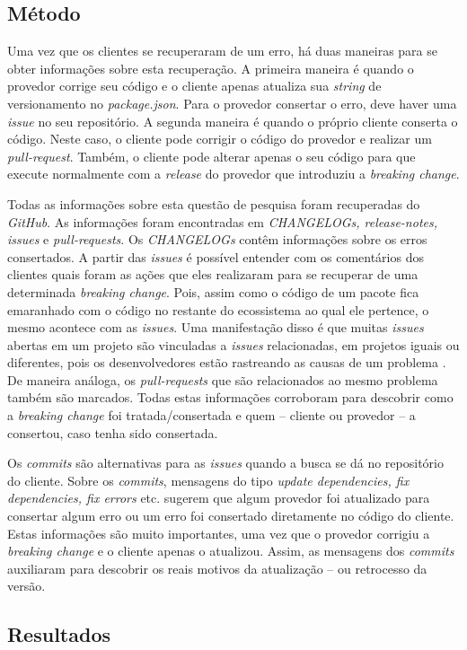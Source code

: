 \subsection{Método}
\label{apr:rq3}
Uma vez que os clientes se recuperaram de um erro, há duas maneiras para se obter informações sobre esta recuperação. A primeira maneira é quando o provedor corrige seu código e o cliente apenas atualiza sua \textit{string} de versionamento no \textit{package.json}. Para o provedor consertar o erro, deve haver uma \textit{issue} no seu repositório. A segunda maneira é quando o próprio cliente conserta o código. Neste caso, o cliente pode corrigir o código do provedor e realizar um \textit{pull-request}. Também, o cliente pode alterar apenas o seu código para que execute normalmente com a \textit{release} do provedor que introduziu a \textit{breaking change}.

Todas as informações sobre esta questão de pesquisa foram recuperadas do \textit{GitHub}. As informações foram encontradas em \textit{CHANGELOGs, release-notes, issues} e \textit{pull-requests}. Os \textit{CHANGELOGs} contêm informações sobre os erros consertados. A partir das \textit{issues} é possível entender com os comentários dos clientes quais foram as ações que eles realizaram para se recuperar de uma determinada \textit{breaking change}. Pois, assim como o código de um pacote fica emaranhado com o código no restante do ecossistema ao qual ele pertence, o mesmo acontece com as \textit{issues}. Uma manifestação disso é que muitas \textit{issues} abertas em um projeto são vinculadas a \textit{issues} relacionadas, em projetos iguais ou diferentes, pois os desenvolvedores estão rastreando as causas de um problema \cite{Zhang:2018:WIL:3242887.3242891}. De maneira análoga, os \textit{pull-requests} que são relacionados ao mesmo problema também são marcados. Todas estas informações corroboram para descobrir como a \textit{breaking change} foi tratada/consertada e quem -- cliente ou provedor -- a consertou, caso tenha sido consertada.

Os \textit{commits} são alternativas para as \textit{issues} quando a busca se dá no repositório do cliente. Sobre os \textit{commits}, mensagens do tipo \textit{update dependencies, fix dependencies, fix errors} etc. sugerem que algum provedor foi atualizado para consertar algum erro ou um erro foi consertado diretamente no código do cliente. Estas informações são muito importantes, uma vez que o provedor corrigiu a \textit{breaking change} e o cliente apenas o atualizou. Assim, as mensagens dos \textit{commits} auxiliaram para descobrir os reais motivos da atualização -- ou retrocesso da versão.

\subsection{Resultados}
\label{d_fin:rq3}